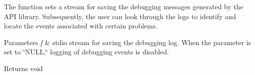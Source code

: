 The function sets a stream for saving the debugging messages generated by the A\+PI library. Subsequently, the user can look through the logs to identify and locate the events associated with certain problems. 


\begin{DoxyParams}{Parameters}
{\em f} & stdio stream for saving the debugging log. When the parameter is set to \char`\"{}\+N\+U\+L\+L,\char`\"{} logging of debugging events is disabled. \\
\hline
\end{DoxyParams}
\begin{DoxyReturn}{Returns}
void 
\end{DoxyReturn}
